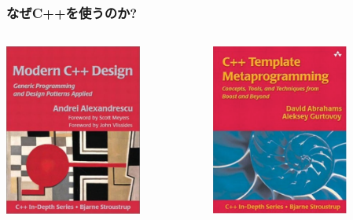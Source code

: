 \subsection*{\redm\whitem\greenb}
\begin{frame}
  \frametitle{なぜC++を使うのか?}
  \begin{columns}[T]
    \begin{column}{.5\textwidth}
      \centering \includegraphics[width=4.5cm]{modern-cxx.pdf}
    \end{column}
    \begin{column}{.5\textwidth}
      \centering \includegraphics[width=4.5cm]{cxx-template.pdf}
    \end{column}
  \end{columns}
\end{frame}

